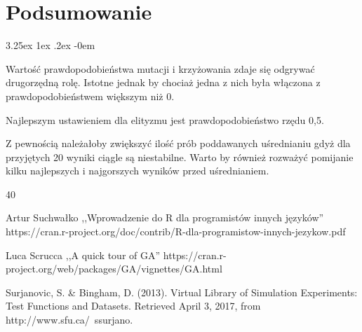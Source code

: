 \documentclass[11pt, a4paper]{article}
\makeatletter
\newcommand{\fbi}{\leavevmode{\parindent=1em\indent}}
\renewcommand\paragraph{\@startsection{paragraph}{5}{\z@}
  {3.25ex \@plus1ex \@minus.2ex}
  {-0em}
  {\normalfont\normalsize\bfseries}}
\makeatother
\begin{document}
\newpage
\section{Podsumowanie}
\paragraph{}


\fbi
Wartość prawdopodobieństwa mutacji i krzyżowania zdaje się odgrywać drugorzędną rolę. Istotne jednak by chociaż jedna z nich była włączona z prawdopodobieństwem większym niż 0.

\fbi
Najlepszym ustawieniem dla elityzmu jest prawdopodobieństwo rzędu 0,5.

\fbi
Z pewnością należałoby zwiększyć ilość prób poddawanych uśrednianiu gdyż dla przyjętych 20 wyniki ciągle są niestabilne. Warto by również rozważyć pomijanie kilku najlepszych i najgorszych wyników przed uśrednianiem.

\newpage
\begin{thebibliography}{40}

Artur Suchwałko ,,Wprowadzenie do R dla programistów innych języków'' https://cran.r-project.org/doc/contrib/R-dla-programistow-innych-jezykow.pdf

Luca Scrucca ,,A quick tour of GA''
https://cran.r-project.org/web/packages/GA/vignettes/GA.html

Surjanovic, S. \& Bingham, D. (2013). Virtual Library of Simulation Experiments: Test Functions and Datasets. Retrieved April 3, 2017, from http://www.sfu.ca/~ssurjano.

\end{thebibliography}
\end{document}
